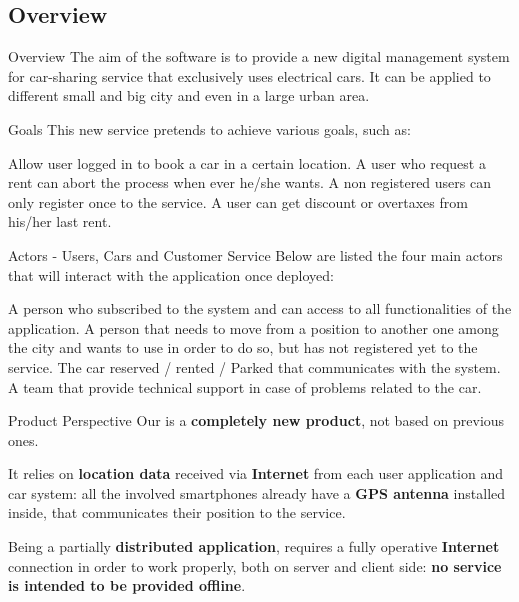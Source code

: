 \documentclass{../Common/Structure/pdf_presentation}
\begin{document}
	\subsection{Overview}
	\begin{frame}{Overview}
		The aim of the software is to provide a new digital management system for car-sharing service that exclusively uses
		electrical cars. It can be applied to different small and big city and even in a large urban area.
	\end{frame}
	\begin{frame}{Goals}
		This new service pretends to achieve various goals, such as:
		\begin{itemize}
			 Allow user logged in to book a car in a certain location.
			 A user who request a rent can abort the process when ever he/she wants.
			 A non registered users can only register once to the service.
			 A user can get discount or overtaxes from his/her last rent.
		\end{itemize}
	\end{frame}
	\begin{frame}{Actors - Users, Cars and Customer Service}
		Below are listed the four main actors that will interact with the application once deployed:
		\begin{itemize}
			 A person who subscribed to the system and can access to all functionalities of the application.
			 A person that needs to move from a position	to another one among the city and wants to use \PowerEnJoy{} in order to do so, but has not registered yet to the service.
			 The car reserved / rented / Parked that communicates with the system.
			 A team that provide technical support in case of problems related to the car.
		\end{itemize}
	\end{frame}
	\begin{frame}{Product Perspective}
		Our \PowerEnJoy{} is a \textbf{completely new product}, not based on previous ones.\par
		It relies on \textbf{location data} received via \textbf{Internet} from each user application and car system: all the involved smartphones already have a \textbf{GPS antenna} installed inside, that communicates their position to the service.\par
		Being a partially \textbf{distributed application}, \PowerEnJoy{} requires a fully operative \textbf{Internet} connection in order to work properly, both on server and client side: \textbf{no service is intended to be provided offline}.
	\end{frame}
\end{document}
